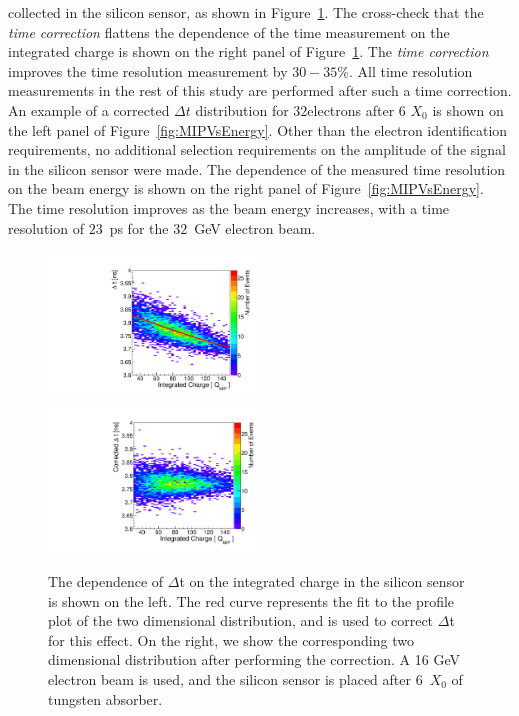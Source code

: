 collected in the silicon sensor, as shown in
Figure~\ref{fig:timewalk}. The cross-check that the \textit{time correction} flattens the dependence of the time measurement
on the integrated charge is shown on the right panel of
Figure~\ref{fig:timewalk}. The \textit{time correction} improves the time resolution measurement by
$30-35$\%. All time resolution measurements in the rest of this study are
performed after such a time correction. An example of a corrected $\Delta t$
distribution for $32$\GeV electrons after 6 $X_0$ is shown on the left
panel of
Figure~\ref{fig:MIPVsEnergy}. Other than the electron
identification requirements, no additional selection requirements on the
amplitude of the signal in the silicon sensor were made. The dependence of the
measured time resolution on the beam energy is shown on the right
panel of
Figure~\ref{fig:MIPVsEnergy}. The time resolution
improves as the beam energy increases, with a time resolution of $23$~ps for the
$32$~GeV electron beam.
\begin{figure}[h] 
\centering
\includegraphics[width=0.49\textwidth]{plots/DeltaT_vs_Charge_Uncorrected.pdf} 
\includegraphics[width=0.5\textwidth]{plots/DeltaT_vs_Charge_Corrected.pdf} 
\caption{ The dependence of $\Delta$t on the integrated charge in the 
silicon sensor is shown on the left. The red curve represents the fit to the
profile plot of the two dimensional distribution, and is used to correct
$\Delta$t for this effect. On the right, we show the corresponding two dimensional
distribution after performing the correction. A 16 GeV electron beam is used, and the silicon sensor is placed
after 6~$X_0$ of tungsten absorber.
} 
\label{fig:timewalk} 
\end{figure} 

